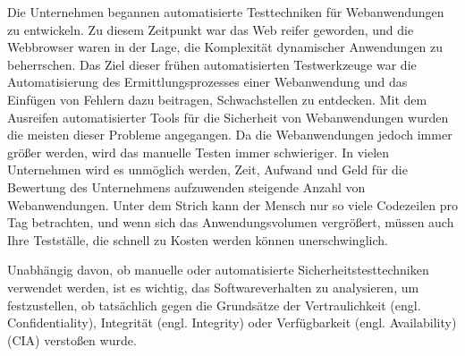 Die Unternehmen begannen automatisierte Testtechniken für Webanwendungen zu entwickeln. Zu diesem Zeitpunkt war das Web reifer geworden, und die Webbrowser waren in der Lage, die Komplexität dynamischer Anwendungen zu beherrschen. Das Ziel dieser frühen automatisierten Testwerkzeuge war die Automatisierung des Ermittlungsprozesses einer Webanwendung und das Einfügen von Fehlern dazu beitragen, Schwachstellen zu entdecken. Mit dem Ausreifen automatisierter Tools für die Sicherheit von Webanwendungen wurden die meisten dieser Probleme angegangen. Da die Webanwendungen jedoch immer größer werden, wird das manuelle Testen immer schwieriger. In vielen Unternehmen wird es unmöglich werden, Zeit, Aufwand und Geld für die Bewertung des Unternehmens aufzuwenden steigende Anzahl von Webanwendungen. Unter dem Strich kann der Mensch nur so viele Codezeilen pro Tag betrachten, und wenn sich das Anwendungsvolumen vergrößert, müssen auch Ihre Testställe, die schnell zu Kosten werden können unerschwinglich\cite[2--5]{wasasibm08}.

Unabhängig davon, ob manuelle oder automatisierte Sicherheitstesttechniken verwendet werden, ist es wichtig, das Softwareverhalten zu analysieren, um festzustellen, ob tatsächlich gegen die Grundsätze der Vertraulichkeit (engl. Confidentiality), Integrität (engl. Integrity) oder Verfügbarkeit (engl. Availability) (CIA) verstoßen wurde\cite{moaast17}.











